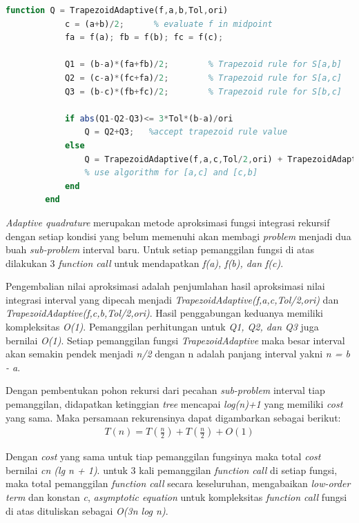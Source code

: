 \documentclass[journal,12pt,onecolumn,a4paper]{IEEEtran}
\begin{document}
\begin{center}
	\begin{lstlisting}[language=Octave]
		function Q = TrapezoidAdaptive(f,a,b,Tol,ori)
			c = (a+b)/2;      % evaluate f in midpoint
			fa = f(a); fb = f(b); fc = f(c);

			Q1 = (b-a)*(fa+fb)/2;        % Trapezoid rule for S[a,b]
			Q2 = (c-a)*(fc+fa)/2;        % Trapezoid rule for S[a,c]
			Q3 = (b-c)*(fb+fc)/2;        % Trapezoid rule for S[b,c]

			if abs(Q1-Q2-Q3)<= 3*Tol*(b-a)/ori
				Q = Q2+Q3;   %accept trapezoid rule value
			else
				Q = TrapezoidAdaptive(f,a,c,Tol/2,ori) + TrapezoidAdaptive(f,c,b,Tol/2,ori);
				% use algorithm for [a,c] and [c,b]
			end
		end
	\end{lstlisting}
\end{center}

\emph{Adaptive quadrature} merupakan metode aproksimasi fungsi integrasi rekursif dengan setiap kondisi yang belum memenuhi akan membagi \emph{problem} menjadi dua buah \emph{sub-problem} interval baru. Untuk setiap pemanggilan fungsi di atas dilakukan 3 \emph{function call} untuk mendapatkan \emph{f(a), f(b), dan f(c)}.

Pengembalian nilai aproksimasi adalah penjumlahan hasil aproksimasi nilai integrasi interval yang dipecah menjadi \emph{TrapezoidAdaptive(f,a,c,Tol/2,ori)} dan \emph{TrapezoidAdaptive(f,c,b,Tol/2,ori)}. Hasil penggabungan keduanya memiliki kompleksitas \emph{O(1)}. Pemanggilan perhitungan untuk \emph{Q1, Q2, dan Q3} juga bernilai \emph{O(1)}. Setiap pemanggilan fungsi \emph{TrapezoidAdaptive} maka besar interval akan semakin pendek menjadi \emph{n/2} dengan n adalah panjang interval yakni \emph{n = b - a}.

Dengan pembentukan pohon rekursi dari pecahan \emph{sub-problem} interval tiap pemanggilan, didapatkan ketinggian \emph{tree} mencapai \emph{log(n)+1} yang memiliki \emph{cost} yang sama. Maka persamaan rekurensinya dapat digambarkan sebagai berikut:
\begin{equation*}
	\begin{split}
		T(n) = T(\frac{n}{2}) + T(\frac{n}{2}) + O(1)
	\end{split}
\end{equation*}

Dengan \emph{cost} yang sama untuk tiap pemanggilan fungsinya maka total \emph{cost} bernilai \emph{cn (lg n + 1)}. untuk 3 kali pemanggilan \emph{function call} di setiap fungsi, maka total pemanggilan \emph{function call} secara keseluruhan, mengabaikan \emph{low-order term} dan konstan \emph{c}, \emph{asymptotic equation} untuk kompleksitas \emph{function call} fungsi di atas dituliskan sebagai \emph{O(3n log n)}.
\end{document}
